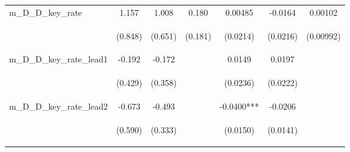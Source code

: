 \documentclass[]{article}
\begin{document}
\begin{center}
\begin{tabular}{lcccccc}
m\_D\_D\_key\_rate & 1.157 & 1.008 & 0.180 & 0.00485 & -0.0164 & 0.00102 \\
\vspace{4pt} & \begin{footnotesize}(0.848)\end{footnotesize} & \begin{footnotesize}(0.651)\end{footnotesize} & \begin{footnotesize}(0.181)\end{footnotesize} & \begin{footnotesize}(0.0214)\end{footnotesize} & \begin{footnotesize}(0.0216)\end{footnotesize} & \begin{footnotesize}(0.00992)\end{footnotesize} \\
m\_D\_D\_key\_rate\_lead1 & -0.192 & -0.172 &  & 0.0149 & 0.0197 &  \\
\vspace{4pt} & \begin{footnotesize}(0.429)\end{footnotesize} & \begin{footnotesize}(0.358)\end{footnotesize} & \begin{footnotesize}\end{footnotesize} & \begin{footnotesize}(0.0236)\end{footnotesize} & \begin{footnotesize}(0.0222)\end{footnotesize} & \begin{footnotesize}\end{footnotesize} \\
m\_D\_D\_key\_rate\_lead2 & -0.673 & -0.493 &  & -0.0400*** & -0.0206 &  \\
\vspace{4pt} & \begin{footnotesize}(0.590)\end{footnotesize} & \begin{footnotesize}(0.333)\end{footnotesize} & \begin{footnotesize}\end{footnotesize} & \begin{footnotesize}(0.0150)\end{footnotesize} & \begin{footnotesize}(0.0141)\end{footnotesize} & \begin{footnotesize}\end{footnotesize} \\

\end{tabular}
\end{center}
\end{document}
